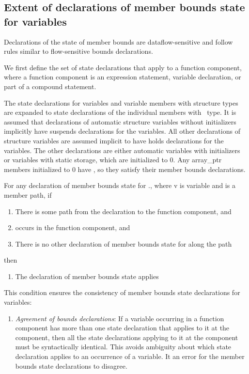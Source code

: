 \subsection{Extent of declarations of member bounds state for variables}\label{extent-of-declarations-of-member-bounds-state-for-variables}

Declarations of the state of member bounds are dataflow-sensitive and
follow rules similar to flow-sensitive bounds declarations.

We first define the set of state declarations that apply to a function
component, where a function component is an expression statement,
variable declaration, or part of a compound statement.

The state declarations for variables and variable members with structure
types are expanded to state declarations of the individual members with
\arrayptr\ type. It is assumed that declarations of automatic
structure variables without initializers implicitly have suspends
declarations for the variables. All other declarations of structure
variables are assumed implicit to have holds declarations for the
variables. The other declarations are either automatic variables with
initializers or variables with static storage, which are initialized to
0. Any array\_ptr members initialized to 0 have \boundsany, so
they satisfy their member bounds declarations.

For any declaration of member bounds state for ., where
v is variable and  is a member path, if

\begin{enumerate}
\item
  There is some path from the declaration to the function component, and
\item
   occurs in the function component, and
\item
  There is no other declaration of member bounds state for 
  along the path
\end{enumerate}

then

\begin{enumerate}
\item
  The declaration of member bounds state applies
\end{enumerate}

This condition ensures the consistency of member bounds state
declarations for variables:

\begin{enumerate}
\item
  \emph{Agreement of bounds declarations}: If a variable occurring in a
  function component has more than one state declaration that applies to
  it at the component, then all the state declarations applying to it at
  the component must be syntactically identical. This avoids ambiguity
  about which state declaration applies to an occurrence of a variable.
  It an error for the member bounds state declarations to disagree.
\end{enumerate}

